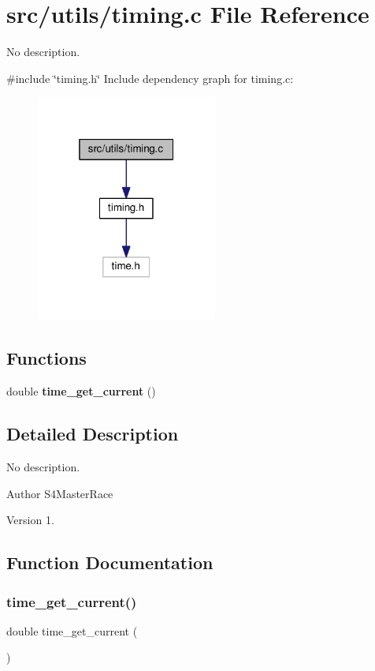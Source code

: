 \section{src/utils/timing.c File Reference}
\label{timing_8c}


No description.  


{\ttfamily \#include \char`\"{}timing.\+h\char`\"{}}\newline
Include dependency graph for timing.\+c\+:
\nopagebreak
\begin{figure}[H]
\begin{center}
\leavevmode
\includegraphics[width=169pt]{timing_8c__incl}
\end{center}
\end{figure}
\subsection*{Functions}
\begin{DoxyCompactItemize}
\item 
double \textbf{ time\+\_\+get\+\_\+current} ()
\end{DoxyCompactItemize}


\subsection{Detailed Description}
No description. 

\begin{DoxyAuthor}{Author}
S4\+Master\+Race 
\end{DoxyAuthor}
\begin{DoxyVersion}{Version}
1. 
\end{DoxyVersion}


\subsection{Function Documentation}
\mbox{\label{timing_8c_a899d3b327b932a5d17c71bb5613e5f33}} 
\subsubsection{time\+\_\+get\+\_\+current()}
{\footnotesize\ttfamily double time\+\_\+get\+\_\+current (\begin{DoxyParamCaption}{ }\end{DoxyParamCaption})\hspace{0.3cm}{\ttfamily [inline]}}

